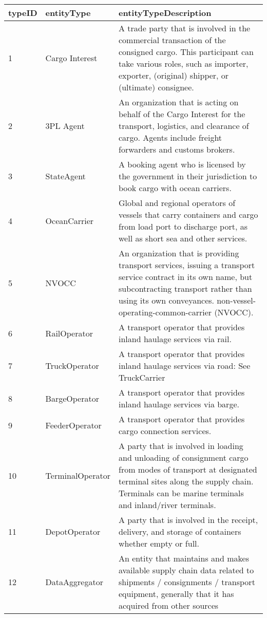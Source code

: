 ﻿\begin{table}
    \centering
    \begin{tabular}{|l|l|l|}
    \hline
        typeID & entityType & entityTypeDescription \\ \hline
        1 & Cargo Interest & A trade party that is involved in the commercial transaction of the consigned cargo. This participant can take various roles, such as importer, exporter, (original) shipper, or (ultimate) consignee. \\ \hline
        2 & 3PL Agent & An organization that is acting on behalf of the Cargo Interest for the transport, logistics, and clearance of cargo. Agents include freight forwarders and customs brokers. \\ \hline
        3 & StateAgent & A booking agent who is licensed by the government in their jurisdiction to book cargo with ocean carriers. \\ \hline
        4 & OceanCarrier & Global and regional operators of vessels that carry containers and cargo from load port to discharge port, as well as short sea and other services. \\ \hline
        5 & NVOCC & An organization that is providing transport services, issuing a transport service contract in its own name, but subcontracting transport rather than using its own conveyances. non-vessel-operating-common-carrier (NVOCC). \\ \hline
        6 & RailOperator & A transport operator that provides inland haulage services via rail. \\ \hline
        7 & TruckOperator & A transport operator that provides inland haulage services via road: See TruckCarrier \\ \hline
        8 & BargeOperator & A transport operator that provides inland haulage services via barge. \\ \hline
        9 & FeederOperator & A transport operator that provides cargo connection services. \\ \hline
        10 & TerminalOperator & A party that is involved in loading and unloading of consignment cargo from modes of transport at designated terminal sites along the supply chain. Terminals can be marine terminals and inland/river terminals. \\ \hline
        11 & DepotOperator & A party that is involved in the receipt, delivery, and storage of containers whether empty or full. \\ \hline
        12 & DataAggregator & An entity that maintains and makes available supply chain data related to shipments / consignments / transport equipment, generally that it has acquired from other sources \\ \hline

\end{tabular}
\end{table}
